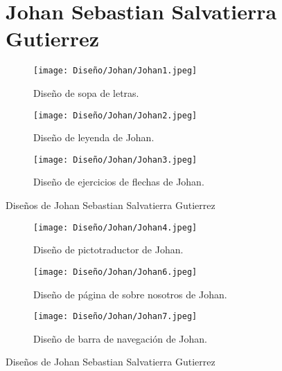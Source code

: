 \begin{figure}[ht!]
  \section{Johan Sebastian Salvatierra Gutierrez}
  \label{sec:disenyoJohan}
  \begin{subfigure}{\textwidth}
    \centering
    \texttt{[image: Diseño/Johan/Johan1.jpeg]}
    \caption{Diseño de sopa de letras.}
    \label{Johan1}
  \end{subfigure}

  \begin{subfigure}{\textwidth}
    \centering
    \texttt{[image: Diseño/Johan/Johan2.jpeg]}
    \caption{Diseño de leyenda de Johan.}
    \label{Johan2}
  \end{subfigure}

  \begin{subfigure}{\textwidth}
    \centering
    \texttt{[image: Diseño/Johan/Johan3.jpeg]}
    \caption{Diseño de ejercicios de flechas de Johan.}
    \label{Johan3}
  \end{subfigure}

  \caption{Diseños de Johan Sebastian Salvatierra Gutierrez}
  \label{fig:disenyoJohan}
\end{figure}

\begin{figure}[ht!]
  \ContinuedFloat
  \begin{subfigure}{\textwidth}
    \centering
    \texttt{[image: Diseño/Johan/Johan4.jpeg]}
    \caption{Diseño de pictotraductor de Johan.}
    \label{Johan4}
  \end{subfigure}

  \begin{subfigure}{\textwidth}
    \centering
    \texttt{[image: Diseño/Johan/Johan6.jpeg]}
    \caption{Diseño de página de sobre nosotros de Johan.}
    \label{Johan6}
  \end{subfigure}

  \begin{subfigure}{\textwidth}
    \centering
    \texttt{[image: Diseño/Johan/Johan7.jpeg]}
    \caption{Diseño de barra de navegación de Johan.}
    \label{Johan7}
  \end{subfigure}

  \caption{Diseños de Johan Sebastian Salvatierra Gutierrez}
  \label{fig:disenyoJohan}
\end{figure}

